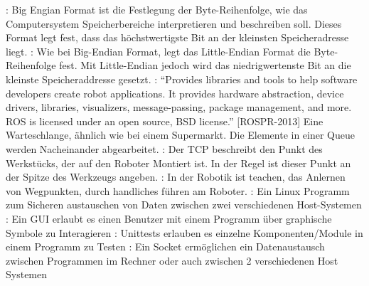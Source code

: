 \begin{acronym}
 : Big Engian Format ist die Festlegung der Byte-Reihenfolge, wie das Computersystem Speicherbereiche interpretieren und beschreiben soll. Dieses Format legt fest, dass das höchstwertigste Bit an der kleinsten Speicheradresse liegt.
 : Wie bei \acs{Big-Endian Format}, legt das Little-Endian Format die Byte-Reihenfolge fest. Mit Little-Endian jedoch wird das niedrigwertenste Bit an die kleinste Speicheraddresse gesetzt.
 : ``Provides libraries and tools to help software developers create robot applications. It provides hardware abstraction, device drivers, libraries, visualizers, message-passing, package management, and more. ROS is licensed under an open source, BSD license.'' [ROSPR-2013]
  Eine Warteschlange, ähnlich wie bei einem Supermarkt. Die Elemente in einer Queue werden Nacheinander abgearbeitet. 
 : Der TCP beschreibt den Punkt des Werkstücks, der auf den Roboter Montiert ist. In der Regel ist dieser Punkt an der Spitze des Werkzeugs angeben.
 : In der Robotik ist teachen, das Anlernen von Wegpunkten, durch handliches führen am Roboter.
 : Ein Linux Programm zum Sicheren austauschen von Daten zwischen zwei verschiedenen Host-Systemen
 : Ein GUI erlaubt es einen Benutzer mit einem Programm über graphische Symbole zu Interagieren
 : Unittests erlauben es einzelne Komponenten/Module in einem Programm zu Testen
 : Ein Socket ermöglichen ein Datenaustausch zwischen Programmen im Rechner oder auch zwischen 2 verschiedenen Host Systemen
\end{acronym}

